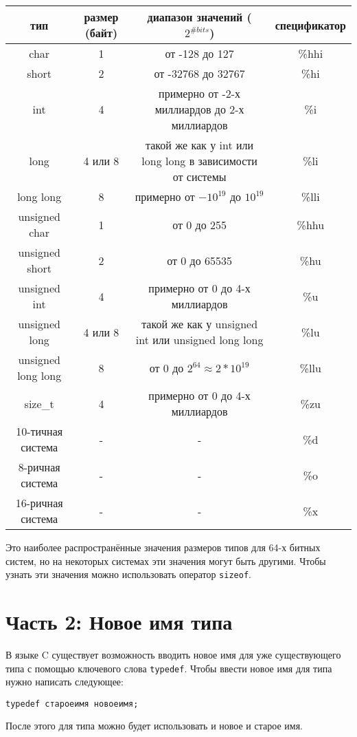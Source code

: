 \documentclass{article}
\begin{document}
\begin{center}
\begin{tabular}{ c c c c }
 тип & размер (байт) & диапазон значений ($2^{\# bits}$) & спецификатор \\ \hline
 char & 1 & от -128 до 127 & \%hhi \\ 
 short & 2 & от -32768 до 32767 & \%hi  \\  
 int & 4 & примерно от -2-х миллиардов до 2-х миллиардов & \%i  \\  
 long & 4 или 8 & такой же как у int или long long в зависимости от системы & \%li  \\  
 long long & 8 & примерно от $-10^{19}$ до $10^{19}$ & \%lli  \\  
 unsigned char & 1 & от 0 до 255 & \%hhu \\ 
 unsigned short & 2 & от 0 до 65535 & \%hu  \\  
 unsigned int & 4 & примерно от 0 до 4-х миллиардов & \%u  \\  
 unsigned long & 4 или 8 & такой же как у unsigned int или unsigned long long & \%lu  \\  
 unsigned long long & 8 & от 0 до $2^{64} \approx 2*10^{19}$  & \%llu  \\  
 size\_t & 4 & примерно от 0 до 4-х миллиардов & \%zu \\ \hline
 10-тичная система & - & - & \%d \\
 8-ричная система & - & - & \%o \\
 16-ричная система & - & - & \%x  \\ 
\end{tabular}
\end{center}
Это наиболее распространённые значения размеров типов для 64-х битных систем, но на некоторых системах эти значения могут быть другими.
Чтобы узнать эти значения можно использовать оператор \texttt{sizeof}. \\

\section*{Часть 2: Новое имя типа}
В языке C существует возможность вводить новое имя для уже существующего типа с помощью ключевого слова \texttt{typedef}. Чтобы ввести новое имя для типа нужно написать следующее:
\begin{lstlisting}
typedef староеимя новоеимя;
\end{lstlisting}
После этого для типа можно будет использовать и новое и старое имя.
\end{document}
